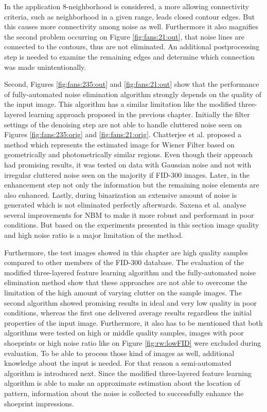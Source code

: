 \documentclass[draft,final]{vutinfth} %
\begin{document}
In the application 8-neighborhood is considered, a more allowing connectivity criteria, such as neighborhood in a given range, leads closed contour edges.
But this causes more connectivity among noise as well.
Furthermore it also magnifies the second problem occurring on Figure \ref{fig:fans:21:out}, that noise lines are connected to the contours, thus are not eliminated.
An additional postprocessing step is needed to examine the remaining edges and determine which connection was made unintentionally.
\par
Second, Figures \ref{fig:fans:235:out} and \ref{fig:fans:21:out} show that the performance of fully-automated noise elimination algorithm strongly depends on the quality of the input image.
This algorithm has a similar limitation like the modified three-layered learning approach proposed in the previous chapter.
Initially the filter settings of the denoising step are not able to handle cluttered noise seen on Figures \ref{fig:fans:235:orig} and \ref{fig:fans:21:orig}.
Chatterjee et al. \cite{chatterjee2011patch} proposed a method which represents the estimated image for Wiener Filter based on geometrically and photometrically similar regions.
Even though their approach had promising results, it was tested on data with Gaussian noise and not with irregular cluttered noise seen on the majority if FID-300 images.
Later, in the enhancement step not only the information but the remaining noise elements are also enhanced.
Lastly, during binarization an extensive amount of noise is generated which is  not eliminated perfectly afterwards.
Saxena et al. \cite{saxena2019niblack} analyse several improvements for NBM to make it more robust and performant in poor conditions.
But based on the experiments presented in this section image quality and high noise ratio is a major limitation of the method.

\par
Furthermore, the test images showed in this chapter are high quality samples compared to other members of the FID-300 database.
The evaluation of the modified three-layered feature learning algorithm and the fully-automated noise elimination method show that these approaches are not able to overcome the limitation of the high amount of varying clutter on the sample images.
The second algorithm showed promising results in ideal and very low quality in poor conditions, whereas the first one delivered average results regardless the initial properties of the input image.
Furthermore, it also has to be mentioned that both algorithms were tested on high or middle quality samples, images with poor shoeprints or high noise ratio like on Figure \ref{fig:rw:lowFID} were excluded during evaluation.
To be able to process those kind of images as well, additional knowledge about the input is needed.
For that reason a semi-automated algorithm is introduced next.
Since the modified three-layered feature learning algorithm is able to make an approximate estimation about the location of pattern, information about the noise is collected to successfully enhance the shoeprint impressions.
\end{document}
